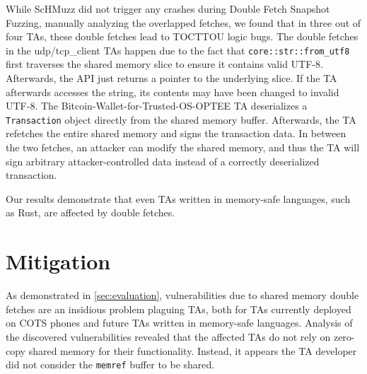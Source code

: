 \documentclass[letterpaper,twocolumn,10pt]{article}
\newcommand{\sysname}{ScHMuzz\xspace}
\newcommand{\stagetwo}{Double Fetch Snapshot Fuzzing\xspace}
\begin{document}
While \sysname did not trigger any crashes during \stagetwo, manually analyzing the 
overlapped fetches, we found that in three out of four TAs, these double fetches lead to TOCTTOU logic bugs.
The double fetches in the udp/tcp\_client TAs happen due to the fact that \texttt{core::str::from\_utf8} 
first traverses the shared memory slice to ensure it contains valid UTF-8. Afterwards, the API just 
returns a pointer to the underlying slice. If the TA afterwards accesses the string, 
its contents may have been changed to invalid UTF-8. 
The Bitcoin-Wallet-for-Trusted-OS-OPTEE TA deserializes a \texttt{Transaction} object directly from the 
shared memory buffer. Afterwards, the TA refetches the entire shared memory and signs the transaction 
data. In between the two fetches, an attacker can modify the shared memory, and thus the TA will 
sign arbitrary attacker-controlled data instead of a correctly deserialized transaction.
 
Our results demonstrate that even TAs written in memory-safe languages, such as Rust, are affected by double fetches. 


%
%


\section{Mitigation}\label{sec:mitigation}

As demonstrated in \autoref{sec:evaluation}, vulnerabilities due to shared memory 
double fetches are an insidious problem plaguing TAs, both for TAs currently 
deployed on COTS phones and future TAs written in memory-safe languages.
Analysis of the discovered 
vulnerabilities revealed that the affected TAs do not rely on zero-copy shared 
memory for their functionality. Instead, it appears the TA developer did not 
consider the \texttt{memref} buffer to be shared.
\end{document}
